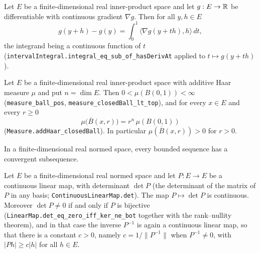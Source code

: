 \begin{proposition}
Let $E$ be a finite-dimensional real inner-product space and let $g:E\to\mathbb{R}$ be
differentiable with continuous gradient $\nabla g$. Then for all $y,h\in E$
\[
  g(y+h)-g(y)=\int_0^1\langle\nabla g(y+th),h\rangle\,dt ,
\]
the integrand being a continuous function of $t$
(\texttt{intervalIntegral.integral\_eq\_sub\_of\_hasDerivAt} applied to
$t\mapsto g(y+th)$).
\end{proposition}

\begin{proposition}
Let $E$ be a finite-dimensional real inner-product space with additive Haar
measure $\mu$ and put $n=\dim E$. Then $0<\mu(B(0,1))<\infty$
(\texttt{measure\_ball\_pos}, \texttt{measure\_closedBall\_lt\_top}), and for
every $x\in E$ and every $r\ge0$
\[
  \mu\bigl(\overline B(x,r)\bigr)=r^{n}\,\mu(B(0,1))
\]
(\texttt{Measure.addHaar\_closedBall}). In particular
$\mu(\overline B(x,r))>0$ for $r>0$.
\end{proposition}

\begin{proposition}
In a finite-dimensional real normed space, every bounded sequence has a
convergent subsequence.
\end{proposition}

\begin{proposition}
Let $E$ be a finite-dimensional real normed space and let $P:E\to E$ be a
continuous linear map, with determinant $\det P$ (the determinant of the matrix
of $P$ in any basis; \texttt{ContinuousLinearMap.det}). The map
$P\mapsto\det P$ is continuous. Moreover $\det P\ne0$ if and only if $P$ is
bijective (\texttt{LinearMap.det\_eq\_zero\_iff\_ker\_ne\_bot} together with the
rank--nullity theorem), and in that case the inverse $P^{-1}$ is again a
continuous linear map, so that there is a constant $c>0$, namely
$c=1/\|P^{-1}\|$ when $P^{-1}\ne0$, with $|Ph|\ge c|h|$ for all $h\in E$.
\end{proposition}

